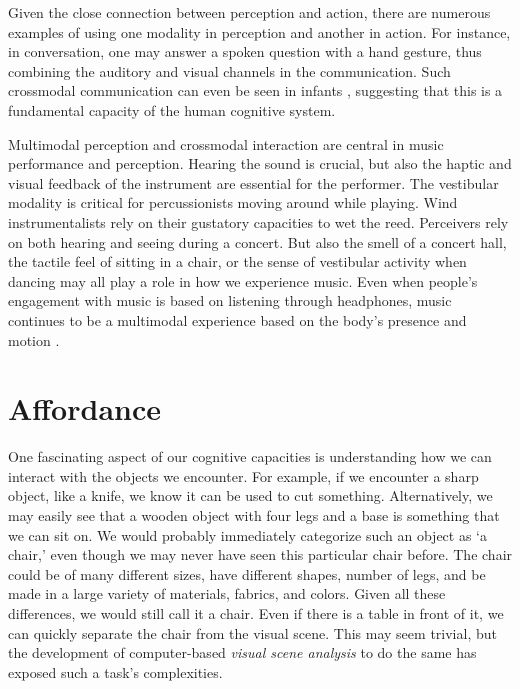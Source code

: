 Given the close connection between perception and action, there are numerous examples of using one modality in perception and another in action. For instance, in conversation, one may answer a spoken question with a hand gesture, thus combining the auditory and visual channels in the communication. Such crossmodal communication can even be seen in infants \citep{trevarthen_musicality_1999}, suggesting that this is a fundamental capacity of the human cognitive system.

Multimodal perception and crossmodal interaction are central in music performance and perception. Hearing the sound is crucial, but also the haptic and visual feedback of the instrument are essential for the performer. The vestibular modality is critical for percussionists moving around while playing. Wind instrumentalists rely on their gustatory capacities to wet the reed. Perceivers rely on both hearing and seeing during a concert. But also the smell of a concert hall, the tactile feel of sitting in a chair, or the sense of vestibular activity when dancing may all play a role in how we experience music. Even when people's engagement with music is based on listening through headphones, music continues to be a multimodal experience based on the body's presence and motion \citep{zelechowska_headphones_2020}.





\section{Affordance}\label{sec:affordance}


One fascinating aspect of our cognitive capacities is understanding how we can interact with the objects we encounter. For example, if we encounter a sharp object, like a knife, we know it can be used to cut something. Alternatively, we may easily see that a wooden object with four legs and a base is something that we can sit on. We would probably immediately categorize such an object as `a chair,' even though we may never have seen this particular chair before. The chair could be of many different sizes, have different shapes, number of legs, and be made in a large variety of materials, fabrics, and colors. Given all these differences, we would still call it a chair. Even if there is a table in front of it, we can quickly separate the chair from the visual scene. This may seem trivial, but the development of computer-based \emph{visual scene analysis} to do the same has exposed such a task's complexities.

